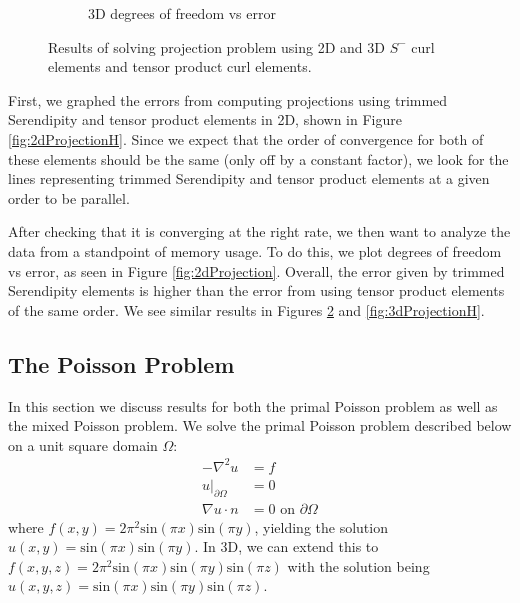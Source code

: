 \documentclass[manuscript,screen]{acmart}
\begin{document}
\begin{figure}[h!]
\begin{subfigure}[h]{0.5\textwidth}
    \caption{3D degrees of freedom vs error}
    \label{fig:3dProjectionDofs}
  \end{subfigure}
  \caption{Results of solving projection problem using 2D and 3D $S^-$ curl elements and tensor product curl elements.}
\end{figure}
  
First, we graphed the errors from computing projections using trimmed Serendipity and tensor product elements in 2D, shown in Figure \ref{fig:2dProjectionH}.  Since we expect that the order of convergence for both of these elements should be the same (only off by a constant factor), we look for the lines representing trimmed Serendipity and tensor product elements at a given order to be parallel.
  
After checking that it is converging at the right rate, we then want to analyze the data from a standpoint of memory usage.  To do this, we plot degrees of freedom vs error, as seen in Figure \ref{fig:2dProjection}.  Overall, the error given by trimmed Serendipity elements is higher than the error from using tensor product elements of the same order.   We see similar results in Figures \ref{fig:3dProjectionDofs} and \ref{fig:3dProjectionH}.
  


\newpage
 
\subsection{The Poisson Problem}
In this section we discuss results for both the primal Poisson problem as well as the mixed Poisson problem.  We solve the primal Poisson problem described below on a unit square domain $\Omega$:
\begin{align}
    -\nabla^2 u &= f \\
    u\vert_{\partial \Omega} &= 0 \\
    \nabla u \cdot n &= 0 \text{ on } \partial \Omega
\end{align}
where $f(x,y) = 2\pi^2\text{sin}(\pi x)\text{sin}(\pi y) $, yielding the solution $u(x,y) = \text{sin}(\pi x)\text{sin}(\pi y)$. In 3D, we can extend this to $f(x,y,z) = 2\pi^2\text{sin}(\pi x)\text{sin}(\pi y)\text{sin}(\pi z)$ with the solution being $u(x,y,z) = \text{sin}(\pi x)\text{sin}(\pi y)\text{sin}(\pi z)$.  
\end{document}
